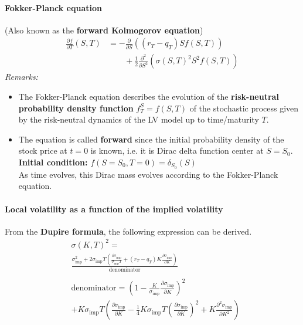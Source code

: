 \documentclass[a4paper,landscape,7pt,fleqn]{scrartcl}
\renewcommand{\emph}[1]{\textbf{#1}}
\begin{document}
\begin{multicols*}{3}
\paragraph{Fokker-Planck equation} (Also known as the \emph{forward Kolmogorov equation})
\begin{align*}
\frac{\partial f}{\partial T}(S,T) &= -\frac{\partial}{\partial S} \left( (r_T - q_T) S f(S,T) \right) \\
& \qquad + \frac{1}{2} \frac{\partial^2}{\partial S^2} \left( \sigma(S,T)^2 S^2 f(S,T) \right)
\end{align*}
\textit{Remarks:}
\begin{itemize}
\item The Fokker-Planck equation describes the evolution of the \emph{risk-neutral probability density function} $f_T^S = f(S,T)$ of the stochastic process given by the risk-neutral dynamics of the LV model up to time/maturity $T$.
\item The equation is called \emph{forward} since the initial probability density of the stock price at $t=0$ is known, i.e. it is Dirac delta function center at $S = S_0$. \\
\emph{Initial condition: } $f(S=S_0,T=0) = \delta_{S_0}(S)$ \\
As time evolves, this Dirac mass evolves according to the Fokker-Planck equation.
\end{itemize}

\paragraph{Local volatility as a function of the implied volatility}
From the \emph{Dupire formula}, the following expression can be derived.
\begin{align*}
& \sigma (K,T)^2 = \\
& \frac{\sigma_{\text{imp}}^2 + 2 \sigma_{\text{imp}} T \left( \frac{\partial \sigma_{\text{imp}}}{\sigma_{\text{imp}} T} + (r_T - q_T) K \frac{\partial \sigma_{\text{imp}}}{\partial K} \right)}{\text{denominator}} \\ \\
& \text{denominator} = \left( 1 - \frac{K}{\sigma_{\text{imp}}} \frac{\partial \sigma_{\text{imp}}}{\partial K} \right)^2 \\
& + K \sigma_{\text{imp}} T \left( \frac{\partial \sigma_{\text{imp}}}{\partial K} - \frac{1}{4} K \sigma_{\text{imp}} T \left( \frac{\partial \sigma_{\text{imp}}}{\partial K} \right)^2 + K \frac{\partial^2 \sigma_{\text{imp}}}{\partial K^2} \right)
\end{align*}


\end{multicols*}
\end{document}
